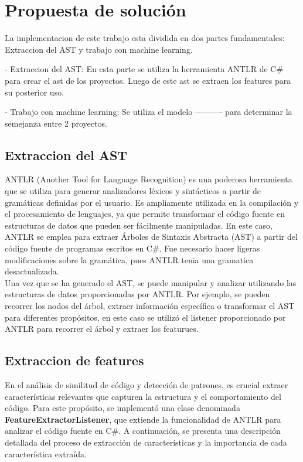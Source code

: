 \chapter{Propuesta de solución}\label{chapter:proposal}

La implementacion  de este trabajo esta dividida en dos partes fundamentales: Extraccion del AST y trabajo con machine learning.

- Extraccion del AST: En esta parte se utiliza la herramienta ANTLR de C\# para crear el ast de los proyectos. Luego de este ast se extraen los features para su posterior uso.

- Trabajo con machine learning: Se utiliza el modelo ---------- para determinar la semejanza entre 2 proyectos.


\section{Extraccion del AST}

ANTLR (Another Tool for Language Recognition) es una poderosa herramienta que se utiliza para generar analizadores léxicos y sintácticos a partir de gramáticas definidas por el usuario. Es ampliamente utilizada en la compilación y el procesamiento de lenguajes, ya que permite transformar el código fuente en estructuras de datos que pueden ser fácilmente manipuladas. En este caso, ANTLR se emplea para extraer Árboles de Sintaxis Abstracta (AST) a partir del código fuente de programas escritos en C\#. Fue necesario hacer ligeras modificaciones sobre la gramática, pues ANTLR tenia una gramatica desactualizada. \\

Una vez que se ha generado el AST, se puede manipular y analizar utilizando las estructuras de datos proporcionadas por ANTLR. Por ejemplo, se pueden recorrer los nodos del árbol, extraer información específica o transformar el AST para diferentes propósitos, en este caso se utilizó el listener proporcionado por ANTLR para recorrer el árbol y extraer los featurues. \\

\section{Extraccion de features}

En el análisis de similitud de código y detección de patrones, es crucial extraer características relevantes que capturen la estructura y el comportamiento del código. Para este propósito, se implementó una clase denominada {\bf FeatureExtractorListener}, que extiende la funcionalidad de ANTLR para analizar el código fuente en C\#. A continuación, se presenta una descripción detallada del proceso de extracción de características y la importancia de cada característica extraída. \\

